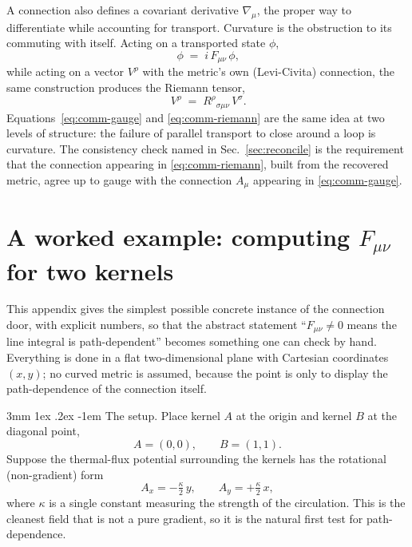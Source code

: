\documentclass[%
 reprint, amsmath,amssymb, aps, prb, ]{revtex4-2}
\makeatletter
\numberwithin{equation}{section}
\renewcommand\paragraph{%
  \@startsection{paragraph}{4}{\z@}%
    {3mm \@plus 1ex \@minus .2ex}%
    {-1em}%
    {\normalfont\normalsize\itshape}}
\makeatother
\begin{document}
A connection also defines a covariant derivative $\nabla_\mu$, the proper way to differentiate while accounting for transport. Curvature is the obstruction to its commuting with itself. Acting on a transported state $\phi$,
\begin{equation}
[\nabla_\mu,\nabla_\nu]\,\phi \;=\; i\,F_{\mu\nu}\,\phi,
\label{eq:comm-gauge}
\end{equation}
while acting on a vector $V^\rho$ with the metric's own (Levi-Civita) connection, the same construction produces the Riemann tensor,
\begin{equation}
[\nabla_\mu,\nabla_\nu]\,V^\rho \;=\; R^\rho{}_{\sigma\mu\nu}\,V^\sigma.
\label{eq:comm-riemann}
\end{equation}
Equations~\eqref{eq:comm-gauge} and \eqref{eq:comm-riemann} are the same idea at two levels of structure: the failure of parallel transport to close around a loop is curvature. The consistency check named in Sec.~\ref{sec:reconcile} is the requirement that the connection appearing in \eqref{eq:comm-riemann}, built from the recovered metric, agree up to gauge with the connection $A_\mu$ appearing in \eqref{eq:comm-gauge}.

\section{A worked example: computing $F_{\mu\nu}$ for two kernels}
\label{app:worked}

This appendix gives the simplest possible concrete instance of the connection door, with explicit numbers, so that the abstract statement ``$F_{\mu\nu}\neq 0$ means the line integral is path-dependent'' becomes something one can check by hand. Everything is done in a flat two-dimensional plane with Cartesian coordinates $(x,y)$; no curved metric is assumed, because the point is only to display the path-dependence of the connection itself.

\paragraph{The setup.}
Place kernel $A$ at the origin and kernel $B$ at the diagonal point,
\begin{equation}
A=(0,0), \qquad B=(1,1).
\label{eq:worked-points}
\end{equation}
Suppose the thermal-flux potential surrounding the kernels has the rotational (non-gradient) form
\begin{equation}
A_x = -\tfrac{\kappa}{2}\,y, \qquad A_y = +\tfrac{\kappa}{2}\,x,
\label{eq:worked-A}
\end{equation}
where $\kappa$ is a single constant measuring the strength of the circulation. This is the cleanest field that is not a pure gradient, so it is the natural first test for path-dependence.
\end{document}
